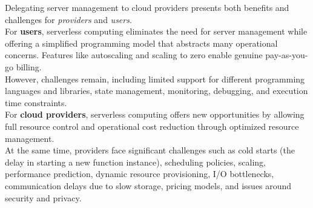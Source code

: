 Delegating server management to cloud providers presents both benefits and challenges for \textit{providers} and \textit{users}.\vspace{14pt}\\
For \textbf{users}, serverless computing eliminates the need for server management while offering a simplified programming model that abstracts many operational concerns. Features like autoscaling and scaling to zero enable genuine pay-as-you-go billing.\\
However, challenges remain, including limited support for different programming languages and libraries, state management, monitoring, debugging, and execution time constraints.\vspace{14pt}\\
For \textbf{cloud providers}, serverless computing offers new opportunities by allowing full resource control and operational cost reduction through optimized resource management.\\
At the same time, providers face significant challenges such as cold starts (the delay in starting a new function instance), scheduling policies, scaling, performance prediction, dynamic resource provisioning, I/O bottlenecks, communication delays due to slow storage, pricing models, and issues around security and privacy.\cite{banaei2022etas}
